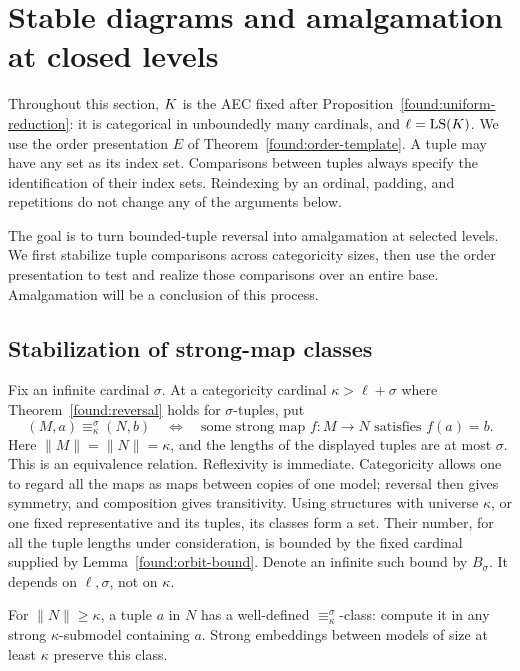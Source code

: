 \section{Stable diagrams and amalgamation at closed levels}
\label{lev:section-diagrams}

Throughout this section, \(K\) is the AEC fixed after
Proposition~\ref{found:uniform-reduction}: it is categorical in unboundedly
many cardinals, and \(\ell=\operatorname{LS}(K)\). We use the order presentation \(E\)
of Theorem~\ref{found:order-template}. A tuple may have any set as its
index set. Comparisons between tuples always specify the identification
of their index sets. Reindexing by an ordinal, padding, and repetitions
do not change any of the arguments below.

The goal is to turn bounded-tuple reversal into amalgamation at selected
levels.  We first stabilize tuple comparisons across categoricity sizes,
then use the order presentation to test and realize those comparisons
over an entire base.  Amalgamation will be a conclusion of this process.

\subsection{Stabilization of strong-map classes}

Fix an infinite cardinal \(\sigma\). At a categoricity cardinal
\(\kappa>\ell+\sigma\) where Theorem~\ref{found:reversal} holds for
\(\sigma\)-tuples, put
\[
 (M,a)\equiv^\sigma_\kappa(N,b)
 \quad\Longleftrightarrow\quad
 \text{some strong map }f:M\longrightarrow N\text{ satisfies }f(a)=b.
\]
Here \(\|M\|=\|N\|=\kappa\), and the lengths of the displayed
tuples are at most \(\sigma\).
This is an equivalence relation. Reflexivity is immediate. Categoricity
allows one to regard all the maps as maps between copies of one model;
reversal then gives symmetry, and composition gives transitivity.
Using structures with universe \(\kappa\), or one fixed representative
and its tuples, its classes form a set. Their number, for all the tuple
lengths under consideration, is bounded by the fixed cardinal supplied
by Lemma~\ref{found:orbit-bound}. Denote an infinite such bound by
\(B_\sigma\). It depends on \(\ell,\sigma\), not on \(\kappa\).

\begin{lemma}
\label{lev:canonical-classes}
For \(\|N\|\ge\kappa\), a tuple \(a\) in \(N\) has a well-defined
\(\equiv^\sigma_\kappa\)-class: compute it in any strong
\(\kappa\)-submodel containing \(a\). Strong embeddings between models
of size at least \(\kappa\) preserve this class.
\end{lemma}

